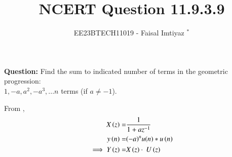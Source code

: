 \documentclass[journal,12pt,twocolumn]{IEEEtran}
\theoremstyle{remark}
\begin{document}

\vspace{3cm}
\title{NCERT Question 11.9.3.9}
\author{EE23BTECH11019 - Faisal Imtiyaz $^{*}$%
}
\maketitle
\newpage
\bigskip

\renewcommand{\thefigure}{\arabic{figure}}
\renewcommand{\thetable}{\arabic{table}}


\vspace{3cm}
\textbf{Question:} Find the sum to indicated number of terms in the geometric progression:\\
$1,-a, a^2, -a^3,...n$ terms (if $a\neq-1$).\\
\solution

\newline
From ,
\begin{align}
X\left(z\right) =& \frac{1}{1+az^{-1}}\\
y\left(n\right)= &{(-a)^n}u(n)*u\left(n\right)\\
\implies Y\left(z\right)= &X\left(z\right)\cdot\ U\left(z\right)
\end{align}
\end{document}
